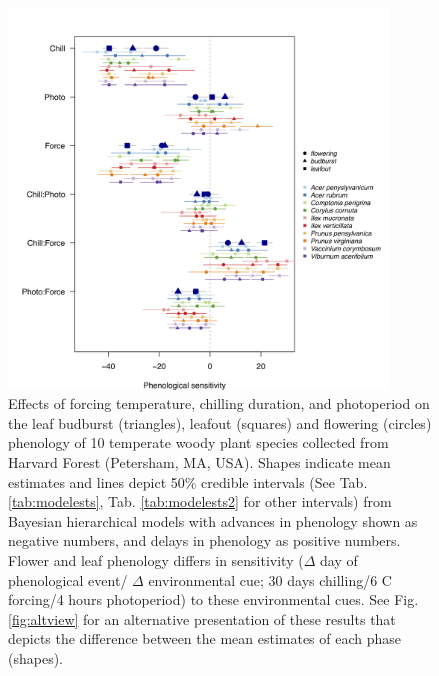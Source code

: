 \documentclass[12pt]{article}\usepackage[]{graphicx}\usepackage[]{color}
\begin{document}
\begin{figure}[h!]
    \centering
         \includegraphics[width=0.9\textwidth]{..//Plots/Flobuds_manuscript_figs/all3phases.png}
         \caption{Effects of forcing temperature, chilling duration, and photoperiod on the leaf budburst (triangles), leafout (squares) and flowering (circles) phenology of 10 temperate woody plant species collected from Harvard Forest (Petersham, MA, USA). Shapes indicate mean estimates and lines depict 50\% credible intervals (See Tab. \ref{tab:modelests}, Tab. \ref{tab:modelests2} for other intervals) from Bayesian hierarchical models with advances in phenology shown as negative numbers, and delays in phenology as positive numbers. Flower and leaf phenology differs in sensitivity ($\Delta$ day of phenological event/ $\Delta$ environmental cue; 30 days chilling/6 \degree C forcing/4 hours photoperiod) to these environmental cues. See Fig. \ref{fig:altview} for an alternative presentation of these results that depicts the difference between the mean estimates of each phase (shapes). }
    \label{fig:model}
\end{figure}
\end{document}
